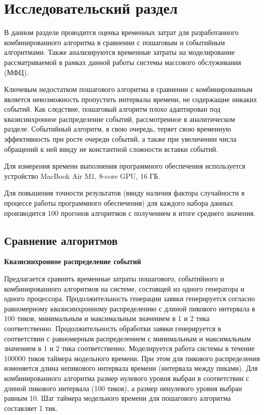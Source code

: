 \chapter{Исследовательский раздел}
В данном разделе проводится оценка временных затрат для разработанного комбинированного алгоритма в сравнении с пошаговым и событийным алгоритмами. Также анализируются временные затраты на моделирование рассматриваемой в рамках данной работы системы массового обслуживания (МФЦ).


Ключевым недостатком пошагового алгоритма в сравнении с комбинированным является невозможность пропустить интервалы времени, не содержащие никаких событий. Как следствие, пошаговый алгоритм плохо адаптирован под квазисинхронное распределение событий, рассмотренное в аналитическом разделе. Событийный алгоритм, в свою очередь, теряет свою временную эффективность при росте очереди событий, а также при увеличении числа обращений к ней ввиду не константной сложности вставки событий.

Для измерения времени выполнения программного обеспечения используется устройство MacBook Air M1, 8-core GPU, 16 ГБ.

Для повышения точности результатов (ввиду наличия фактора случайности в процессе работы программного обеспечения) для каждого набора данных производится 100 прогонов алгоритмов с получением в итоге среднего значения.

\section{Сравнение алгоритмов}

\textbf{Квазисинхронное распределение событий}

Предлагается сравнить временные затраты пошагового, событийного и комбинированного алгоритмов на системе, состоящей из одного генератора и одного процессора. Продолжительность генерации заявки генерируется согласно равномерному квазисинхронному распределению с длиной пикового интервала в 100 тиков, минимальным и максимальным значением в 1 и 2 тика соответственно. Продолжительность обработки заявки генерируется в соответствии с равномерным распределением с минимальным и максимальным значением в 1 и 2 тика соответственно.
Моделируется работа системы в течение 100000 тиков таймера модельного времени. При этом для пикового распределения изменяется длина непикового интервала времени (интервала между пиками). Для комбинированного алгоритма размер нулевого уровня выбран в соответствии с длиной пикового интервала (100 тиков), а размер ненулевого уровня выбран равным 10. Шаг таймера модельного времени для пошагового алгоритма составляет 1 тик.

